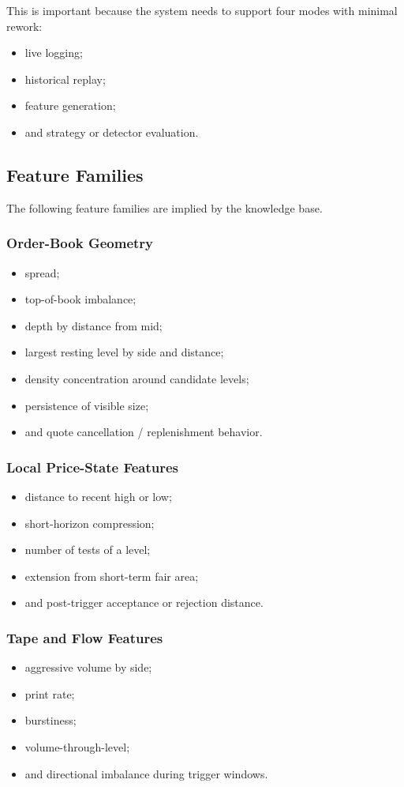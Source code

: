 This is important because the system needs to support four modes with minimal rework:
\begin{itemize}
  \item live logging;
  \item historical replay;
  \item feature generation;
  \item and strategy or detector evaluation.
\end{itemize}

\subsection{Feature Families}

The following feature families are implied by the knowledge base.

\subsubsection{Order-Book Geometry}
\begin{itemize}
  \item spread;
  \item top-of-book imbalance;
  \item depth by distance from mid;
  \item largest resting level by side and distance;
  \item density concentration around candidate levels;
  \item persistence of visible size;
  \item and quote cancellation / replenishment behavior.
\end{itemize}

\subsubsection{Local Price-State Features}
\begin{itemize}
  \item distance to recent high or low;
  \item short-horizon compression;
  \item number of tests of a level;
  \item extension from short-term fair area;
  \item and post-trigger acceptance or rejection distance.
\end{itemize}

\subsubsection{Tape and Flow Features}
\begin{itemize}
  \item aggressive volume by side;
  \item print rate;
  \item burstiness;
  \item volume-through-level;
  \item and directional imbalance during trigger windows.
\end{itemize}

